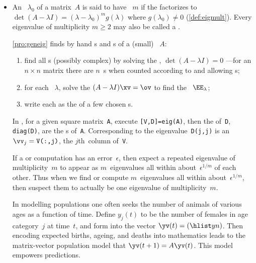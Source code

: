 \begin{itemize}
\item An ~\(\lambda_0\) of a matrix~\(A\) is said to have ~\(m\) if the  factorizes to \(\det(A-\lambda I)=(\lambda-\lambda_0)^mg(\lambda)\) where \(g(\lambda_0)\neq0\) (\cref{def:eigmult}).
Every eigenvalue of multiplicity \(m\geq2\) may also be called a .

\itemme \cref{pro:geneig} finds by hand s and s of a (small) ~\(A\):
\begin{enumerate}
\item find all s (possibly complex) by solving the , \(\det(A-\lambda I)=0\) ---for an \(n\times n\) matrix there are \(n\)~s when counted according to  and allowing s;
\item for each ~\(\lambda\), solve the   \((A-\lambda I)\xv=\ov\) to find the ~\(\EE_\lambda\);
\item write each  as the  of a few chosen s.
\end{enumerate}

In \script, for a given square matrix~\verb|A|, execute 
\verb|[V,D]=eig(A)|, then the  of~\verb|D|, 
\verb|diag(D)|, are the s of~\verb|A|. 
Corresponding to the eigenvalue~\verb|D(j,j)| is an   \(\vv_j=\verb|V(:,j)|\), the \(j\)th~column of~\verb|V|.  

\itemme If a  or computation has an error~\(\epsilon\), then expect a repeated eigenvalue of multiplicity~\(m\) to appear as \(m\)~eigenvalues all within about~\(\epsilon^{1/m}\) of each other.
Thus when we find or compute \(m\)~eigenvalues all within about~\(\epsilon^{1/m}\), then suspect them to actually be one eigenvalue of multiplicity~\(m\).

\itemhi In modelling populations one often seeks the number of animals of various ages as a function of time.
Define \(y_j(t)\) to be the number of females in age category~\(j\) at time~\(t\), and form into the vector \(\yv(t)=(\hlist yn)\).
Then encoding expected births, ageing, and deaths into mathematics leads to the matrix-vector population model that \(\yv(t+1)=A\yv(t)\).
This model empowers predictions.



\end{itemize}
